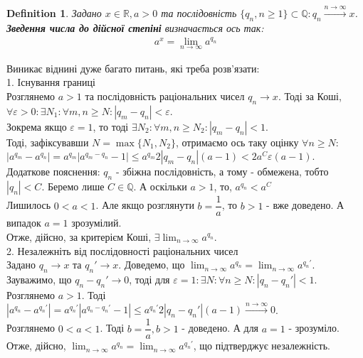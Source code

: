 \documentclass[a4paper, 14pt]{article}
\def\huge{\displaystyle}
\theoremstyle{theoremdd}
\theoremstyle{theoremdd}
\newtheorem{definition}[theorem]{Definition}
\theoremstyle{theoremdd}
\theoremstyle{theoremdd}
\theoremstyle{theoremdd}
\theoremstyle{theoremdd}
\theoremstyle{theoremdd}
\theoremstyle{theoremdd}
\begin{document}
\begin{definition}
Задано $x \in \mathbb{R}, a > 0$ та послідовність $\{q_n, n \geq 1\} \subset \mathbb{Q}: q_n \overset{n \to \infty}{\longrightarrow} x$.\\
\textbf{Зведення числа до дійсної степіні} визначається ось так:
\begin{align*}
a^x = \huge\lim_{n \to \infty} a^{q_n}
\end{align*}
\end{definition}
Виникає віднині дуже багато питань, які треба розв'язати:
\bigskip \\
1. Існування границі\\
Розглянемо $a > 1$ та послідовність раціональних чисел $q_n \to x$. Тоді за Коші,\\
$\forall \varepsilon > 0: \exists N_1: \forall m,n \geq N: |q_m-q_n| <\varepsilon$.\\
Зокрема якщо $\varepsilon = 1$, то тоді $\exists N_2: \forall m,n \geq N_2: |q_m-q_n| < 1$.\\
Тоді, зафіксувавши $N = \max\{N_1,N_2\}$, отримаємо ось таку оцінку $\forall n \geq N:$\\
$|a^{q_m}-a^{q_n}| = a^{q_m}|a^{q_m-q_n}-1| \leq a^{q_m} 2 |q_m-q_n|(a-1) \boxed{<} 2 a^C \varepsilon (a-1)$.\\
Додаткове пояснення: $q_n$ - збіжна послідовність, а тому - обмежена, тобто $|q_n| < C$. Беремо лише $C \in \mathbb{Q}$. А оскільки $a > 1$, то, $a^{q_n} < a^C$\\
Лишилось $0 < a < 1$. Але якщо розглянути $b = \dfrac{1}{a}$, то $b>1$ - вже доведено. А випадок $a = 1$ зрозумілий.\\
Отже, дійсно, за критерієм Коші, $\exists \huge\lim_{n \to \infty} a^{q_n}$.
\bigskip \\
2. Незалежніть від послідовності раціональних чисел\\
Задано $q_n \to x$ та $q_n' \to x$. Доведемо, що $\huge\lim_{n \to \infty} a^{q_n} = \huge\lim_{n \to \infty} a^{q_n'}$.\\
Зауважимо, що $q_n - q_n' \to 0$, тоді для $\varepsilon = 1: \exists N: \forall n \geq N: |q_n-q_n'| < 1$.\\
Розглянемо $a > 1$. Тоді $|a^{q_n} - a^{q_n'}| = a^{q_n'}|a^{q_n-q_n'}-1| \leq a^{q_n'} 2|q_n-q_n'|(a-1) \overset{n \to \infty}{\longrightarrow} 0$.\\
Розглянемо $0 < a < 1$. Тоді $b = \dfrac{1}{a}, b > 1$ - доведено. А для $a = 1$ - зрозуміло.\\
Отже, дійсно,  $\huge\lim_{n \to \infty} a^{q_n} = \huge\lim_{n \to \infty} a^{q_n'}$, що підтверджує незалежність.
\end{document}
